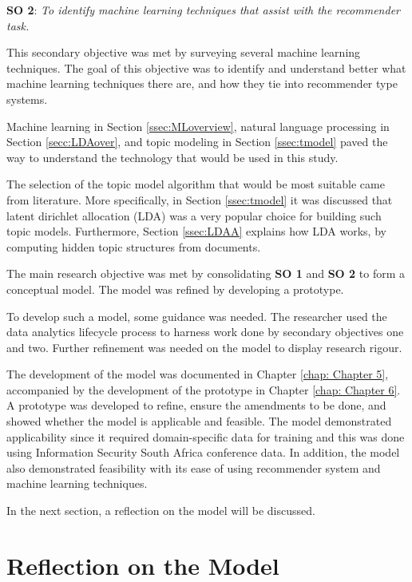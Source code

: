 \textbf{SO 2}: \textit{To identify machine learning techniques that assist with the recommender task.}

This secondary objective was met by surveying several machine learning techniques. The goal of this objective was to identify and understand better what machine learning techniques there are, and how they tie into recommender type systems. 

Machine learning in Section \ref{ssec:MLoverview}, natural language processing in Section \ref{secc:LDAover}, and topic modeling in Section \ref{ssec:tmodel} paved the way to understand the technology that would be used in this study.

The selection of the topic model algorithm that would be most suitable came from literature. More specifically, in Section \ref{ssec:tmodel} it was discussed that latent dirichlet allocation (LDA) was a very popular choice for building such topic models. Furthermore, Section \ref{ssec:LDAA} explains how LDA works, by computing hidden topic structures from documents.

The main research objective was met by consolidating \textbf{SO 1} and \textbf{SO 2} to form a conceptual model. The model was refined by developing a prototype. 

To develop such a model, some guidance was needed. The researcher used the data analytics lifecycle process to harness work done by secondary objectives one and two. Further refinement was needed on the model to display research rigour.

The development of the model was documented in Chapter \ref{chap: Chapter 5}, accompanied by the development of the prototype in Chapter \ref{chap: Chapter 6}. A prototype was developed to refine, ensure the amendments to be done, and showed whether the model is applicable and feasible. The model demonstrated applicability since it required domain-specific data for training and this was done using Information Security South Africa conference data. In addition, the model also demonstrated feasibility with its ease of using recommender system and machine learning techniques.

In the next section, a reflection on the model will be discussed.

\section{Reflection on the Model}

